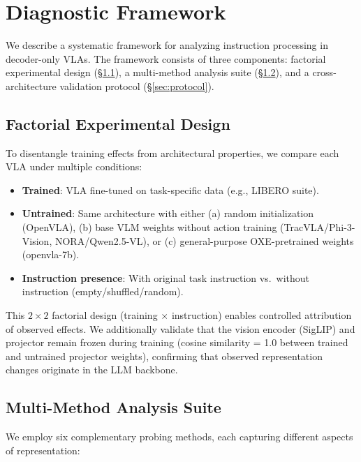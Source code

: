 \documentclass[letterpaper]{article}
\begin{document}
\section{Diagnostic Framework}

We describe a systematic framework for analyzing instruction processing in decoder-only VLAs.
The framework consists of three components: factorial experimental design (\S\ref{sec:factorial}), a multi-method analysis suite (\S\ref{sec:methods}), and a cross-architecture validation protocol (\S\ref{sec:protocol}).

\subsection{Factorial Experimental Design}
\label{sec:factorial}

To disentangle training effects from architectural properties, we compare each VLA under multiple conditions:

\begin{itemize}
    \item \textbf{Trained}: VLA fine-tuned on task-specific data (e.g., LIBERO suite).
    \item \textbf{Untrained}: Same architecture with either (a) random initialization (OpenVLA), (b) base VLM weights without action training (TracVLA/Phi-3-Vision, NORA/Qwen2.5-VL), or (c) general-purpose OXE-pretrained weights (openvla-7b).
    \item \textbf{Instruction presence}: With original task instruction vs.\ without instruction (empty/shuffled/random).
\end{itemize}

This $2 \times 2$ factorial design (training $\times$ instruction) enables controlled attribution of observed effects.
We additionally validate that the vision encoder (SigLIP) and projector remain frozen during training (cosine similarity = 1.0 between trained and untrained projector weights), confirming that observed representation changes originate in the LLM backbone.

\subsection{Multi-Method Analysis Suite}
\label{sec:methods}

We employ six complementary probing methods, each capturing different aspects of representation:
\end{document}

